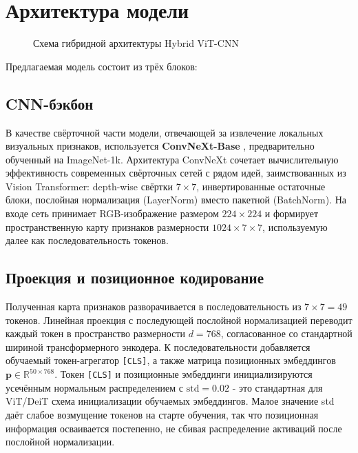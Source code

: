 \documentclass[14pt,a4paper]{extreport}
\begin{document}
\section{Архитектура модели}

\begin{figure}[H]
\centering
{}
\caption{Схема гибридной архитектуры Hybrid ViT-CNN}
\label{fig:architecture}
\end{figure}

Предлагаемая модель состоит из трёх блоков:

\subsection{CNN-бэкбон}

В качестве свёрточной части модели, отвечающей за извлечение локальных
визуальных признаков, используется \textbf{ConvNeXt-Base}
\cite{liu2022convnext}, предварительно обученный на ImageNet-1k.
Архитектура ConvNeXt сочетает вычислительную эффективность современных
свёрточных сетей с рядом идей, заимствованных из Vision Transformer:
depth-wise свёртки $7 \times 7$, инвертированные остаточные блоки,
послойная нормализация (LayerNorm) вместо пакетной (BatchNorm). На входе
сеть принимает RGB-изображение размером $224 \times 224$ и формирует
пространственную карту признаков размерности $1024 \times 7 \times 7$,
используемую далее как последовательность токенов.

\subsection{Проекция и позиционное кодирование}

Полученная карта признаков разворачивается в последовательность из
$7 \times 7 = 49$ токенов. Линейная проекция с последующей послойной
нормализацией переводит каждый токен в пространство размерности $d=768$,
согласованное со стандартной шириной трансформерного энкодера.
К последовательности добавляется обучаемый токен-агрегатор
\texttt{[CLS]}, а также матрица позиционных эмбеддингов
$\mathbf{p} \in \mathbb{R}^{50 \times 768}$. Токен \texttt{[CLS]} и
позиционные эмбеддинги инициализируются усечённым нормальным
распределением с $\text{std} = 0.02$ - это стандартная для ViT/DeiT
схема инициализации обучаемых эмбеддингов. Малое значение std даёт
слабое возмущение токенов на старте обучения, так что позиционная
информация осваивается постепенно, не сбивая распределение активаций
после послойной нормализации.
\end{document}
